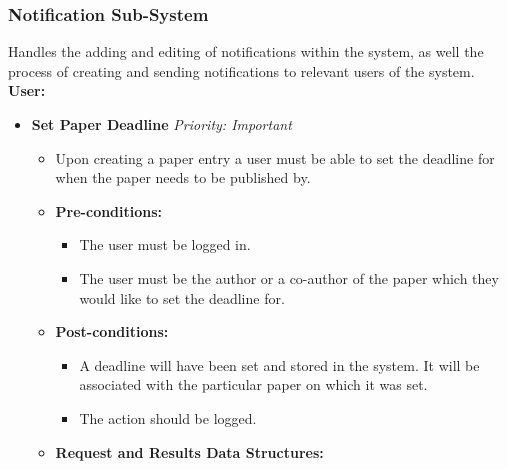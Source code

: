 \documentclass{article}
\begin{document}
			\subsubsection{Notification Sub-System}\label{subsubsec:notification}
				Handles the adding and editing of notifications within the system, as well the process of creating and sending notifications to relevant users of the system.\\
				[3mm]
				\textbf{User:}
				\begin{itemize}
					\item \textbf{Set Paper Deadline} \hfill \textit{Priority: Important}
					\begin{itemize}
						\item Upon creating a paper entry a user must be able to set the deadline for when the paper needs to be published by.
						\item \textbf{Pre-conditions:}
						\begin{itemize}
							\item The user must be logged in.
							\item The user must be the author or a co-author of the paper which they would like to set the deadline for.
						\end{itemize}
						\item \textbf{Post-conditions:}
						\begin{itemize}
							\item A deadline will have been set and stored in the system. It will be associated with the particular paper on which it was set.
							\item The action should be logged.
						\end{itemize}
						\item \textbf{Request and Results Data Structures:}
					\end{itemize}
					

\end{itemize}
\end{document}
